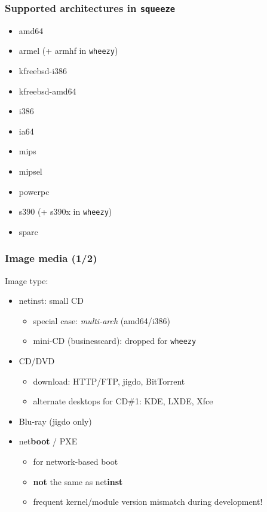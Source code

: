 \documentclass[handout]{beamer}
\begin{document}
\begin{frame}[fragile]
  \frametitle{Supported architectures in \texttt{squeeze}}
  \begin{itemize}
  \item amd64
  \item armel (+ armhf in \texttt{wheezy})
  \item kfreebsd-i386
  \item kfreebsd-amd64
  \item i386
  \item ia64
  \item mips
  \item mipsel
  \item powerpc
  \item s390 (+ s390x in \texttt{wheezy})
  \item sparc
  \end{itemize}
\end{frame}

\begin{frame}[fragile]
  \frametitle{Image media (1/2)}

  Image type:
  \begin{itemize}
  \item netinst: small CD
    \begin{itemize}
    \item special case: \textit{multi-arch} (amd64/i386)
    \item mini-CD (businesscard): dropped for \texttt{wheezy}
    \end{itemize}
  \pause
  \item CD/DVD
    \begin{itemize}
    \item download: HTTP/FTP, jigdo, BitTorrent
    \item alternate desktops for CD\#1: KDE, LXDE, Xfce
    \end{itemize}
  \pause
  \item Blu-ray (jigdo only)
  \pause
  \item net\textbf{boot} / PXE
    \begin{itemize}
    \item for network-based boot
    \item \textbf{not} the same as net\textbf{inst}
    \item frequent kernel/module version mismatch during development!
    \end{itemize}
  \end{itemize}
\end{frame}
\end{document}
